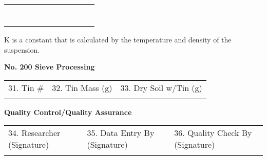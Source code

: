 \documentclass{article}
\newcommand{\TBD}{\cellcolor{aqua}}
\begin{document}
\begin{table}[h]
\begin{tabular}{|c|l|l|l|l|l|l|l|l|l|l|}
&&&&&\TBD&\TBD&\TBD&\TBD&\TBD \\ [1.3ex]\hline
&&&&&\TBD&\TBD&\TBD&\TBD&\TBD \\ [1.3ex]\hline
&&&&&\TBD&\TBD&\TBD&\TBD&\TBD \\ [1.3ex]\hline
&&&&&\TBD&\TBD&\TBD&\TBD&\TBD \\ [1.3ex]\hline
&&&&&\TBD&\TBD&\TBD&\TBD&\TBD \\ [1.3ex]\hline
&&&&&\TBD&\TBD&\TBD&\TBD&\TBD \\ [1.3ex]\hline
&&&&&\TBD&\TBD&\TBD&\TBD&\TBD \\ [1.3ex]\hline
&&&&&\TBD&\TBD&\TBD&\TBD&\TBD \\ [1.3ex]\hline
\end{tabular}
\end{table}
{\scriptsize*K is a constant that is calculated by the temperature and density of the suspension.}

\noindent \textbf{No. 200 Sieve Processing}
\begin{table}[h]
		\begin{tabular}{|l|l|l|}\hline
31. Tin \#		& 32. Tin Mass (g)		&  33. Dry Soil w/Tin (g) \\
							&							&															\\ [1ex]\hline		
		\end{tabular}
\end{table}

\noindent \textbf{Quality Control/Quality Assurance}
\begin{table}[h!]
\begin{tabular}{|p{5.5cm}|p{5.5cm}|p{5.5cm}|}
\hline
34. Researcher (Signature) & 35. Data Entry By (Signature) & 36. Quality Check By (Signature) \\
&& \\ [.7ex] \hline
\end{tabular}
\end{table}
\end{document}
